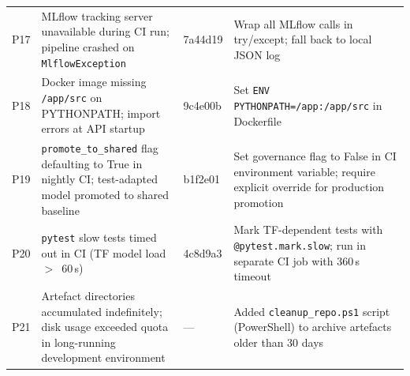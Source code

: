 \begin{longtable}{p{}p{}p{}p{}}
  P17 & MLflow tracking server unavailable during CI run;
        pipeline crashed on \texttt{MlflowException}
     & 7a44d19
     & Wrap all MLflow calls in try/except; fall back to local JSON log \\[4pt]

  P18 & Docker image missing \texttt{/app/src} on PYTHONPATH;
        import errors at API startup
     & 9c4e00b
     & Set \texttt{ENV PYTHONPATH=/app:/app/src} in Dockerfile \\[4pt]

  P19 & \texttt{promote\_to\_shared} flag defaulting to True in nightly CI;
        test-adapted model promoted to shared baseline
     & b1f2e01
     & Set governance flag to False in CI environment variable; require
       explicit override for production promotion \\[4pt]

  P20 & \texttt{pytest} slow tests timed out in CI (TF model load $>$~60\,s)
     & 4c8d9a3
     & Mark TF-dependent tests with \texttt{@pytest.mark.slow};
       run in separate CI job with 360\,s timeout \\[4pt]

  P21 & Artefact directories accumulated indefinitely; disk usage exceeded
        quota in long-running development environment
     & ---
     & Added \texttt{cleanup\_repo.ps1} script (PowerShell) to archive
       artefacts older than 30 days \\[4pt]
\end{longtable}
